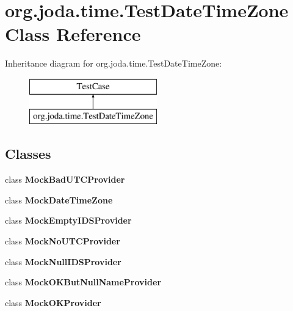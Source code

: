 \hypertarget{classorg_1_1joda_1_1time_1_1_test_date_time_zone}{\section{org.\-joda.\-time.\-Test\-Date\-Time\-Zone Class Reference}
\label{classorg_1_1joda_1_1time_1_1_test_date_time_zone}
}
Inheritance diagram for org.\-joda.\-time.\-Test\-Date\-Time\-Zone\-:\begin{figure}[H]
\begin{center}
\leavevmode
\includegraphics[height=2.000000cm]{classorg_1_1joda_1_1time_1_1_test_date_time_zone}
\end{center}
\end{figure}
\subsection*{Classes}
\begin{DoxyCompactItemize}
\item 
class {\bfseries Mock\-Bad\-U\-T\-C\-Provider}
\item 
class {\bfseries Mock\-Date\-Time\-Zone}
\item 
class {\bfseries Mock\-Empty\-I\-D\-S\-Provider}
\item 
class {\bfseries Mock\-No\-U\-T\-C\-Provider}
\item 
class {\bfseries Mock\-Null\-I\-D\-S\-Provider}
\item 
class {\bfseries Mock\-O\-K\-But\-Null\-Name\-Provider}
\item 
class {\bfseries Mock\-O\-K\-Provider}
\end{DoxyCompactItemize}
